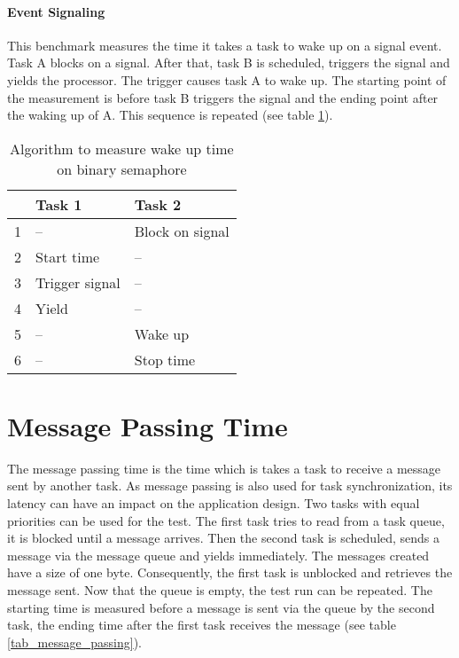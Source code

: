 \paragraph{Event Signaling}
This benchmark measures the time it takes a task to wake up on a signal event.
Task A blocks on a signal.
After that, task B is scheduled, triggers the signal and yields the processor. 
The trigger causes task A to wake up.
The starting point of the measurement is before task B triggers the signal and the ending point after the waking up of A.
This sequence is repeated (see table \ref{tab_binary_semaphore}).

\begin{table}[htbp]
	\centering
		\begin{tabular}{|l|l|l|}
			\hline
				& Task 1 							 	 & Task 2 										\\
				\hline 
				1 & --									   & Block on signal						\\
			  2 & Start time		 				 & --													\\
			  3 & Trigger signal				 & --													\\
			  4 & Yield								 	 & --													\\
			  5 & --									   & Wake up										\\
			  6 & --									 	 & Stop time									\\	  
			\hline
		\end{tabular}
	\caption{Algorithm to measure wake up time on binary semaphore}
	\label{tab_binary_semaphore}
\end{table}

\section{Message Passing Time}
The message passing time is the time which is takes a task to receive a message sent by another task.
As message passing is also used for task synchronization, its latency can have an impact on the application design.
Two tasks with equal priorities can be used for the test.
The first task tries to read from a task queue, it is blocked until a message arrives.
Then the second task is scheduled, sends a message via the message queue and yields immediately. 
The messages created have a size of one byte.
Consequently, the first task is unblocked and retrieves the message sent.
Now that the queue is empty, the test run can be repeated.
The starting time is measured before a message is sent via the queue by the second task, the ending time after the first task receives the message (see table \ref{tab_message_passing}).


